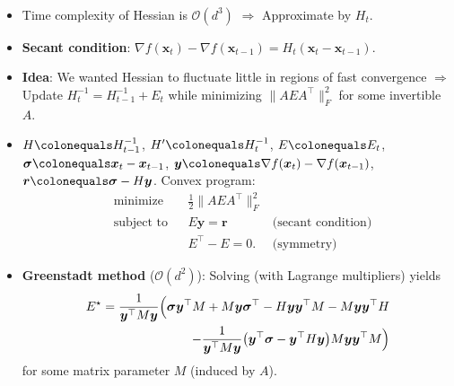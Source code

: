 \documentclass[8pt,a4paper]{extarticle}
\newcommand{\lft}{\mathopen{}\mathclose\bgroup\left}
\newcommand{\rgt}{\aftergroup\egroup\right}
\renewcommand{\vec}[1]{\bm{#1}}
\newcommand{\mat}[1]{#1}
\newenvironment{topic}[1]
{\textbf{\sffamily \colorbox{black}{\rlap{\textbf{\textcolor{white}{#1}}}\hspace{\linewidth}\hspace{-2\fboxsep}}} \\ \vspace{0.2cm}}
{}
\begin{document}
\begin{multicols*}{2}
    \begin{topic}{Quasi-Newton methods}
        \begin{itemize}
            \item Time complexity of Hessian is $\mathcal{O}(d^3)$ $\Rightarrow$ Approximate by $\mat{H}_t$.
            \item \textbf{Secant condition}: $\nabla f(\vec{x}_t) - \nabla f(\vec{x}_{t-1}) = H_t (\vec{x}_t - \vec{x}_{t-1})$.
            \item \textbf{Idea}: We wanted Hessian to fluctuate little in regions of fast convergence $\Rightarrow$ Update $\mat{H}_t^{-1} = \mat{H}_{t-1}^{-1} + \mat{E}_t$ while minimizing $\| \mat{A} \mat{E} \mat{A}^\top \|_F^2$ for some invertible $\mat{A}$.
            \item $\mat{H} \colonequals \mat{H}_{t-1}^{-1}$, $\mat{H}' \colonequals \mat{H}_t^{-1}$, $\mat{E} \colonequals \mat{E}_t$, $\vec{\sigma} \colonequals \vec{x}_t - \vec{x}_{t-1}$, $\vec{y} \colonequals \nabla f(\vec{x}_t) - \nabla f(\vec{x}_{t-1})$, $\vec{r} \colonequals \vec{\sigma} - \mat{H} \vec{y}$. Convex program:
                  \begin{align*}
                       & \text{minimize}   &  & \frac{1}{2} \| \mat{A} \mat{E} \mat{A}^\top \|_F^2                             \\
                       & \text{subject to} &  & \mat{E} \vec{y} = \vec{r}                          & \text{(secant condition)} \\
                       &                   &  & \mat{E}^\top - \mat{E} = \mat{0}.                  & \text{(symmetry)}
                  \end{align*}
            \item \textbf{Greenstadt method} ($\mathcal{O}(d^2)$): Solving (with Lagrange multipliers) yields
                  \begin{align*}
                      \mat{E}^\star = \frac{1}{\vec{y}^\top \mat{M} \vec{y}} \Big( \vec{\sigma} \vec{y}^\top \mat{M} + \mat{M} \vec{y} \vec{\sigma}^\top - \mat{H} \vec{y} \vec{y}^\top \mat{M} - \mat{M} \vec{y} \vec{y}^\top \mat{H} & \\
                      - \frac{1}{\vec{y}^\top \mat{M} \vec{y}} \lft( \vec{y}^\top \vec{\sigma} - \vec{y}^\top \mat{H} \vec{y} \rgt) \mat{M} \vec{y} \vec{y}^\top \mat{M} \Big)                                                         &
                  \end{align*}
                  for some matrix parameter $\mat{M}$ (induced by $\mat{A}$).

\end{itemize}
\end{topic}
\end{multicols*}
\end{document}
